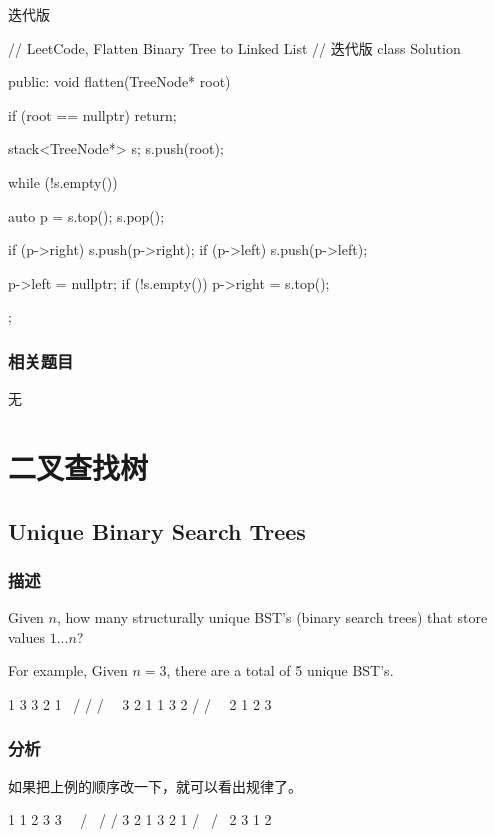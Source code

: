 迭代版
\begin{Code}
// LeetCode, Flatten Binary Tree to Linked List
// 迭代版
class Solution {
public:
    void flatten(TreeNode* root) {
        if (root == nullptr) return;

        stack<TreeNode*> s;
        s.push(root);

        while (!s.empty()) {
            auto p = s.top();
            s.pop();

            if (p->right)
                s.push(p->right);
            if (p->left)
                s.push(p->left);

            p->left = nullptr;
            if (!s.empty())
                p->right = s.top();
        }
    }
};
\end{Code}


\subsubsection{相关题目}
\begindot
\item 无
\myenddot


\section{二叉查找树} %


\subsection{Unique Binary Search Trees}
\label{sec:unique-binary-search-trees}


\subsubsection{描述}
Given $n$, how many structurally unique BST's (binary search trees) that store values $1...n$?

For example,
Given $n = 3$, there are a total of 5 unique BST's.
\begin{Code}
   1         3     3      2      1
    \       /     /      / \      \
     3     2     1      1   3      2
    /     /       \                 \
   2     1         2                 3
\end{Code}

\subsubsection{分析}
如果把上例的顺序改一下，就可以看出规律了。
\begin{Code}
 1       1           2          3       3
  \       \         / \        /       / 
   3       2       1   3      2       1
  /         \                /         \
2            3              1           2
\end{Code}

